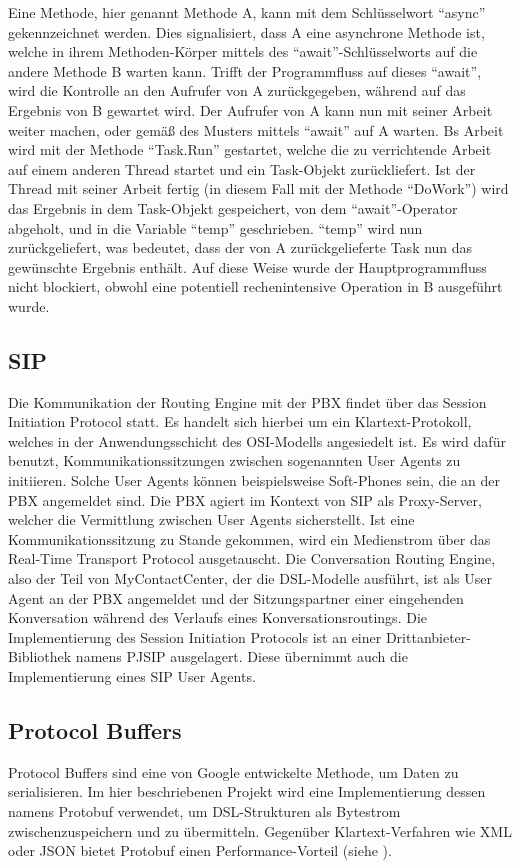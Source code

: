 Eine Methode, hier genannt Methode A, kann mit dem Schlüsselwort ``async'' gekennzeichnet werden. Dies signalisiert, dass A eine asynchrone Methode ist, welche in ihrem Methoden-Körper mittels des ``await''-Schlüsselworts auf die andere Methode B warten kann. Trifft der Programmfluss auf dieses ``await'', wird die Kontrolle an den Aufrufer von A zurückgegeben, während auf das Ergebnis von B gewartet wird. Der Aufrufer von A kann nun mit seiner Arbeit weiter machen, oder gemäß des Musters mittels ``await'' auf A warten. Bs Arbeit wird mit der Methode ``Task.Run'' gestartet, welche die zu verrichtende Arbeit auf einem anderen Thread startet und ein Task-Objekt zurückliefert. Ist der Thread mit seiner Arbeit fertig (in diesem Fall mit der Methode ``DoWork'') wird das Ergebnis in dem Task-Objekt gespeichert, von dem ``await''-Operator abgeholt, und in die Variable ``temp'' geschrieben. ``temp'' wird nun zurückgeliefert, was bedeutet, dass der von A zurückgelieferte Task nun das gewünschte Ergebnis enthält. Auf diese Weise wurde der Hauptprogrammfluss nicht blockiert, obwohl eine potentiell rechenintensive Operation in B ausgeführt wurde.


\subsection{SIP}
Die Kommunikation der Routing Engine mit der PBX findet über das Session Initiation Protocol statt. Es handelt sich hierbei um ein Klartext-Protokoll, welches in der Anwendungsschicht des OSI-Modells angesiedelt ist. Es wird dafür benutzt, Kommunikationssitzungen zwischen sogenannten User Agents zu initiieren. Solche User Agents können beispielsweise Soft-Phones sein, die an der PBX angemeldet sind. Die PBX agiert im Kontext von SIP als Proxy-Server, welcher die Vermittlung zwischen User Agents sicherstellt. Ist eine Kommunikationssitzung zu Stande gekommen, wird ein Medienstrom über das Real-Time Transport Protocol ausgetauscht. Die Conversation Routing Engine, also der Teil von MyContactCenter, der die DSL-Modelle ausführt, ist als User Agent an der PBX angemeldet und der Sitzungspartner einer eingehenden Konversation während des Verlaufs eines Konversationsroutings. Die Implementierung des Session Initiation Protocols ist an einer Drittanbieter-Bibliothek namens PJSIP ausgelagert. Diese übernimmt auch die Implementierung eines SIP User Agents. 

\subsection{Protocol Buffers}
Protocol Buffers sind eine von Google entwickelte Methode, um Daten zu serialisieren. Im hier beschriebenen Projekt wird eine Implementierung dessen namens Protobuf verwendet, um DSL-Strukturen als Bytestrom zwischenzuspeichern und zu übermitteln. Gegenüber Klartext-Verfahren wie XML oder JSON bietet Protobuf einen Performance-Vorteil (siehe \cite{Bowden:14}).

